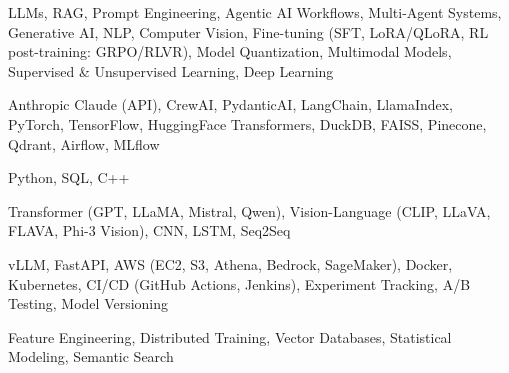 \documentclass[letter,10pt]{article}
\begin{document}
 LLMs, RAG, Prompt Engineering, Agentic AI Workflows, Multi-Agent Systems, Generative AI, NLP, Computer Vision, Fine-tuning (SFT, LoRA/QLoRA, RL post-training: GRPO/RLVR), Model Quantization, Multimodal Models, Supervised \& Unsupervised Learning, Deep Learning\par\vspace{2pt}

 Anthropic Claude (API), CrewAI, PydanticAI, LangChain, LlamaIndex, PyTorch, TensorFlow, HuggingFace Transformers, DuckDB, FAISS, Pinecone, Qdrant, Airflow, MLflow\par\vspace{2pt}

 Python, SQL, C++\par\vspace{2pt}

 Transformer (GPT, LLaMA, Mistral, Qwen), Vision-Language (CLIP, LLaVA, FLAVA, Phi-3 Vision), CNN, LSTM, Seq2Seq\par\vspace{2pt}

 vLLM, FastAPI, AWS (EC2, S3, Athena, Bedrock, SageMaker), Docker, Kubernetes, CI/CD (GitHub Actions, Jenkins), Experiment Tracking, A/B Testing, Model Versioning\par\vspace{2pt}

 Feature Engineering, Distributed Training, Vector Databases, Statistical Modeling, Semantic Search
\end{document}

